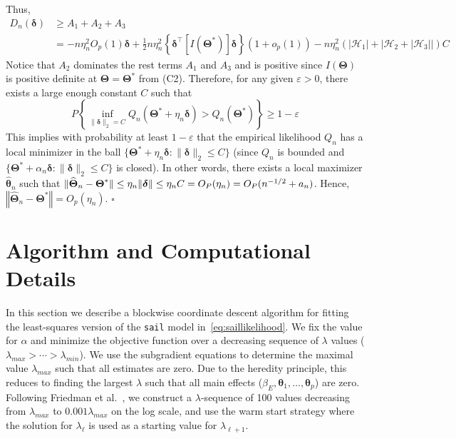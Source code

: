\documentclass[12pt,letter]{article}\usepackage[]{graphicx}\usepackage[]{color}
\newcommand{\btheta}{\boldsymbol{\theta}}
\newcommand{\bThetastar}{\boldsymbol{\Theta}^{*}}
\newcommand{\bdelta}{\boldsymbol{\delta}}
\begin{document}
Thus,
\[
\begin{aligned}D_{n}(\boldsymbol{\delta}) & \geq A_{1}+A_{2}+A_{3}\\
& =-n\eta_{n}^{2}O_{p}(1)\boldsymbol{\delta}+\frac{1}{2}n\eta_{n}^{2}\left\{ \boldsymbol{\delta}^{\top}\left[I\left(\boldsymbol{\Theta}^{*}\right)\right]\boldsymbol{\delta}\right\} \left(1+o_{p}(1)\right)-n\eta_{n}^{2}\left(\left|\mathcal{H}_{1}\right|+\left|\mathcal{H}_{2}+\left|\mathcal{H}_{3}\right|\right|\right)C
\end{aligned}
\]
Notice that $A_{2}$ dominates the rest terms $A_{1}$ and $A_{3}$
and is positive since $I(\boldsymbol{\Theta})$ is positive definite
at $\boldsymbol{\Theta}=\bThetastar$ from (C2). Therefore, for any
given $\varepsilon>0$, there exists a large enough constant $C$
such that 
\[
P\left\{ \underset{\|\bdelta\|_2=C}{\inf}Q_{n}\left(\boldsymbol{\Theta}^{*}+\eta_{n}\boldsymbol{\delta}\right)>Q_{n}\left(\boldsymbol{\Theta}^{*}\right)\right\} \geq1-\varepsilon
\]
This implies with probability at least $1-\varepsilon$ that the empirical
likelihood $Q_{n}$ has a local minimizer in the ball $\{\boldsymbol{\Theta}^{*}+\eta_{n}\mathbf{\bdelta}:\|\mathbf{\bdelta}\|_2\leq C\}$
(since $Q_{n}$ is bounded and $\{\boldsymbol{\Theta}^{*}+\alpha_{n}\bdelta:\|\bdelta\|_2\leq C\}$
is closed). In other words, there exists a local maximizer $\widehat{\btheta}_{n}$
such that $\|\widehat{\boldsymbol{\Theta}}_{n}-\boldsymbol{\Theta}^{*}\|\leq\eta_{n}\|\bdelta\|\leq\eta_{n}C=\Op(\eta_{n})=\Op(n^{-1/2}+a_{n})$.
Hence, $\left\Vert \widehat{\boldsymbol{\Theta}}_{n}-\boldsymbol{\Theta}^{*}\right\Vert =O_{p}\left(\eta_{n}\right).$ $\square$


\section{Algorithm and Computational Details} \label{sec:sail_algorithm}

In this section we describe a blockwise coordinate descent algorithm for fitting the least-squares version of the \texttt{sail} model in~\eqref{eq:saillikelihood}. We fix the value for $\alpha$ and minimize the objective function over a decreasing sequence of $\lambda$ values ($\lambda_{max}>\cdots>\lambda_{min}$). We use the subgradient equations to determine the maximal value $\lambda_{max}$ such that all estimates are zero. Due to the heredity principle, this reduces to finding the largest $\lambda$ such that all main effects ($\beta_E, \btheta_1, \ldots, \btheta_p$) are zero. Following Friedman et al.~\citep{friedman2010regularization}, we construct a $\lambda$-sequence of 100 values decreasing from $\lambda_{max}$ to $0.001 \lambda_{max}$ on the log scale, and use the warm start strategy where the solution for $\lambda_{\ell}$ is used as a starting value for $\lambda_{\ell + 1}$.  
\end{document}
